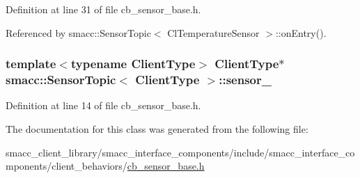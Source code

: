 Definition at line 31 of file cb\+\_\+sensor\+\_\+base.\+h.



Referenced by smacc\+::\+Sensor\+Topic$<$ Cl\+Temperature\+Sensor $>$\+::on\+Entry().

\subsubsection[{\texorpdfstring{sensor\+\_\+}{sensor_}}]{\setlength{\rightskip}{0pt plus 5cm}template$<$typename Client\+Type$>$ Client\+Type$\ast$ {\bf smacc\+::\+Sensor\+Topic}$<$ Client\+Type $>$\+::sensor\+\_\+}\hypertarget{classsmacc_1_1SensorTopic_affbf010b80f779369dd14d786c1ed9e3}{}\label{classsmacc_1_1SensorTopic_affbf010b80f779369dd14d786c1ed9e3}


Definition at line 14 of file cb\+\_\+sensor\+\_\+base.\+h.



The documentation for this class was generated from the following file\+:\begin{DoxyCompactItemize}
\item 
smacc\+\_\+client\+\_\+library/smacc\+\_\+interface\+\_\+components/include/smacc\+\_\+interface\+\_\+components/client\+\_\+behaviors/\hyperlink{cb__sensor__base_8h}{cb\+\_\+sensor\+\_\+base.\+h}\end{DoxyCompactItemize}
